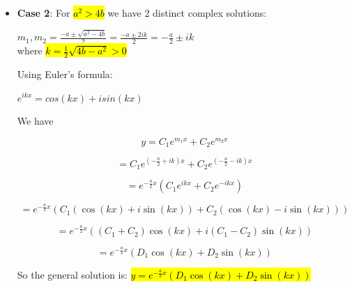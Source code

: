 \documentclass{article}
\begin{document}
\begin{enumerate}
\begin{itemize}
\begin{itemize}
                \item \textbf{Case 2}: For \hl{$a^2 > 4b$} we have 2 distinct complex solutions:
                \begin{center}
                  $m_1,m_2 = \frac{-a \pm \sqrt{a^2-4b}}{2} = \frac{-a \pm 2ik}{2} = - \frac{a}{2} \pm ik$\\
                  where \hl{$k = \frac{1}{2} \sqrt{4b-a^2} > 0$}
                \end{center}
                Using Euler's formula:
                \begin{center}
                  $e^{ikx} = cos(kx) + isin(kx)$
                \end{center}
                
                We have

                \[
                y = C_1 e^{m_1 x} + C_2 e^{m_2 x}
                \]

                \[
                = C_1 e^{\left(-\frac{a}{2} + ik\right)x} + C_2 e^{\left(-\frac{a}{2} - ik\right)x}
                \]

                \[
                = e^{-\frac{a}{2}x} \left( C_1 e^{ikx} + C_2 e^{-ikx} \right)
                \]

                \[
                = e^{-\frac{a}{2}x} \left( C_1 \left(\cos(kx) + i\sin(kx)\right) + C_2 \left(\cos(kx) - i\sin(kx)\right) \right)
                \]

                \[
                = e^{-\frac{a}{2}x} \left( \left(C_1 + C_2\right) \cos(kx) + i \left(C_1 - C_2\right) \sin(kx) \right)
                \]

                \[
                = e^{-\frac{a}{2}x} \left( D_1 \cos(kx) + D_2 \sin(kx) \right)
                \]

                So the general solution is:
                \hl{$y = e^{-\frac{a}{2}x} \left( D_1 \cos(kx) + D_2 \sin(kx) \right)$}


\end{itemize}
\end{itemize}
\end{enumerate}
\end{document}
